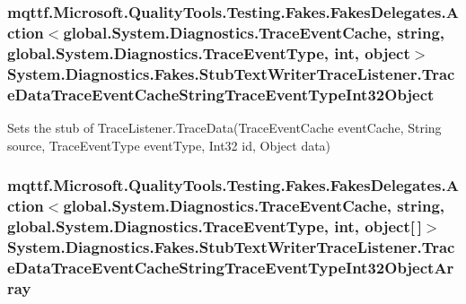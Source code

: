 \hypertarget{class_system_1_1_diagnostics_1_1_fakes_1_1_stub_text_writer_trace_listener_ad8c2294c4c63dd2dac53d0913c37bbea}{
\subsubsection[{Trace\-Data\-Trace\-Event\-Cache\-String\-Trace\-Event\-Type\-Int32\-Object}]{\setlength{\rightskip}{0pt plus 5cm}mqttf.\-Microsoft.\-Quality\-Tools.\-Testing.\-Fakes.\-Fakes\-Delegates.\-Action$<$global.\-System.\-Diagnostics.\-Trace\-Event\-Cache, string, global.\-System.\-Diagnostics.\-Trace\-Event\-Type, int, object$>$ System.\-Diagnostics.\-Fakes.\-Stub\-Text\-Writer\-Trace\-Listener.\-Trace\-Data\-Trace\-Event\-Cache\-String\-Trace\-Event\-Type\-Int32\-Object}}\label{class_system_1_1_diagnostics_1_1_fakes_1_1_stub_text_writer_trace_listener_ad8c2294c4c63dd2dac53d0913c37bbea}


Sets the stub of Trace\-Listener.\-Trace\-Data(\-Trace\-Event\-Cache event\-Cache, String source, Trace\-Event\-Type event\-Type, Int32 id, Object data)

\hypertarget{class_system_1_1_diagnostics_1_1_fakes_1_1_stub_text_writer_trace_listener_aa10b30d8ceba29456cef9b1a08bebd54}{
\subsubsection[{Trace\-Data\-Trace\-Event\-Cache\-String\-Trace\-Event\-Type\-Int32\-Object\-Array}]{\setlength{\rightskip}{0pt plus 5cm}mqttf.\-Microsoft.\-Quality\-Tools.\-Testing.\-Fakes.\-Fakes\-Delegates.\-Action$<$global.\-System.\-Diagnostics.\-Trace\-Event\-Cache, string, global.\-System.\-Diagnostics.\-Trace\-Event\-Type, int, object\mbox{[}$\,$\mbox{]}$>$ System.\-Diagnostics.\-Fakes.\-Stub\-Text\-Writer\-Trace\-Listener.\-Trace\-Data\-Trace\-Event\-Cache\-String\-Trace\-Event\-Type\-Int32\-Object\-Array}}\label{class_system_1_1_diagnostics_1_1_fakes_1_1_stub_text_writer_trace_listener_aa10b30d8ceba29456cef9b1a08bebd54}


